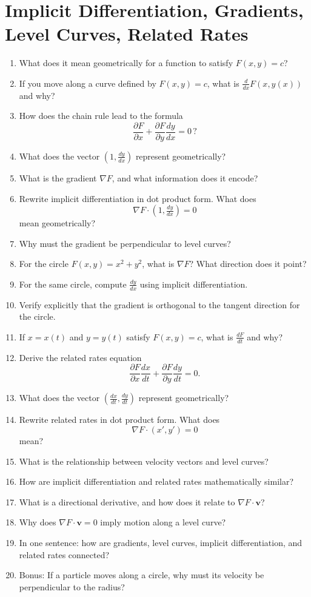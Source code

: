 \section{Implicit Differentiation, Gradients, Level Curves, Related Rates}

\begin{enumerate}
  \item What does it mean geometrically for a function to satisfy $F(x,y) = c$?
  \item If you move along a curve defined by $F(x,y)=c$, what is $\frac{d}{dx}F(x,y(x))$ and why?
  \item How does the chain rule lead to the formula
    \[
      \frac{\partial F}{\partial x} + \frac{\partial F}{\partial y}\frac{dy}{dx} = 0 \, ?
    \]
  \item What does the vector $(1, \frac{dy}{dx})$ represent geometrically?
  \item What is the gradient $\nabla F$, and what information does it encode?
  \item Rewrite implicit differentiation in dot product form. What does
    \[
      \nabla F \cdot (1, \tfrac{dy}{dx}) = 0
    \]
    mean geometrically?
  \item Why must the gradient be perpendicular to level curves?
  \item For the circle $F(x,y)=x^2+y^2$, what is $\nabla F$? What direction does it point?
  \item For the same circle, compute $\frac{dy}{dx}$ using implicit differentiation.
  \item Verify explicitly that the gradient is orthogonal to the tangent direction for the circle.
  \item If $x=x(t)$ and $y=y(t)$ satisfy $F(x,y)=c$, what is $\frac{dF}{dt}$ and why?
  \item Derive the related rates equation
    \[
      \frac{\partial F}{\partial x}\frac{dx}{dt} + \frac{\partial F}{\partial y}\frac{dy}{dt} = 0.
    \]
  \item What does the vector $(\frac{dx}{dt}, \frac{dy}{dt})$ represent geometrically?
  \item Rewrite related rates in dot product form. What does
    \[
      \nabla F \cdot (x', y') = 0
    \]
    mean?
  \item What is the relationship between velocity vectors and level curves?
  \item How are implicit differentiation and related rates mathematically similar?
  \item What is a directional derivative, and how does it relate to $\nabla F \cdot \mathbf{v}$?
  \item Why does $\nabla F \cdot \mathbf{v} = 0$ imply motion along a level curve?
  \item In one sentence: how are gradients, level curves, implicit differentiation, and related rates connected?
  \item Bonus: If a particle moves along a circle, why must its velocity be perpendicular to the radius?
\end{enumerate}
